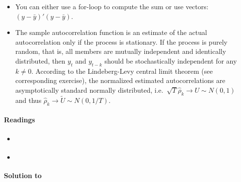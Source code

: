\begin{enumerate}
\begin{itemize}
\item
You can either use a for-loop to compute the sum or use vectors: \((y - \bar{y})'(y - \bar{y})\).

\item
The sample autocorrelation function is an estimate of the actual autocorrelation only if the process is stationary.
If the process is purely random, that is, all members are mutually independent and identically distributed,
  then \(y_t\) and \(y_{t-k}\) should be stochastically independent for any \(k\neq 0\).
According to the Lindeberg-Levy central limit theorem (see corresponding exercise),
  the normalized estimated autocorrelations are asymptotically standard normally distributed, i.e.\
  \(\sqrt{T} \hat{\rho}_k \rightarrow U \sim N(0,1)\)
  and thus \(\hat{\rho}_k \rightarrow \tilde{U} \sim N(0,1/T)\).
\end{itemize}

\end{enumerate}

\paragraph{Readings}

\begin{itemize}
\item \textcite[Ch.2]{Bjornland.Thorsrud_2015_AppliedTimeSeries}
\item \textcite{Lutkepohl_2004_UnivariateTimeSeries}
\end{itemize}

\begin{solution}\textbf{Solution to }
\ifDisplaySolutions%

\fi
\newpage
\end{solution}